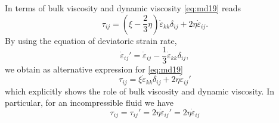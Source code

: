 In terms of bulk viscosity and dynamic viscosity \eqref{eq:md19} reads
\[
\tau_{ij} = (\xi-\frac23 \eta) \dot\varepsilon_{kk} \delta_{ij} + 2\eta \dot\varepsilon_{ij}.
\]
By using the equation of deviatoric strain rate,
\[
\dot\varepsilon_{ij}' = \dot\varepsilon_{ij} -\frac13  \dot\varepsilon_{kk} \delta_{ij},
\]
we obtain as alternative expression for \eqref{eq:md19}
\begin{equation}
\tau_{ij} = \xi  \dot\varepsilon_{kk} \delta_{ij} + 2 \eta \dot\varepsilon_{ij}'
\label{eq:md21}
\end{equation}
which explicitly shows the role of bulk viscosity and dynamic viscosity. In particular, for
an incompressible fluid we have
\begin{equation}
\tau_{ij}=\tau_{ij}'=2\eta \dot\varepsilon_{ij}' = 2 \eta \dot\varepsilon_{ij}
\label{eq:md22}
\end{equation}


\vspace{0.5cm}
\vspace{0.5cm}







